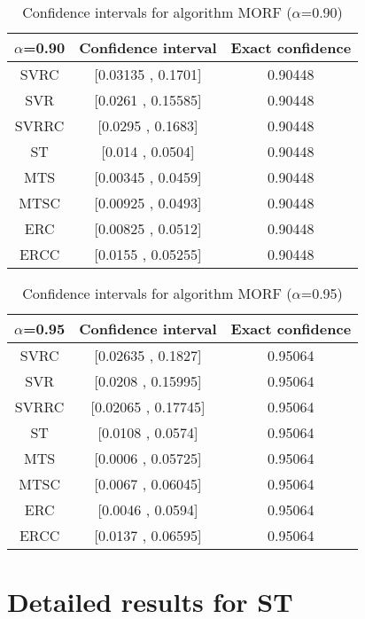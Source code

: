 \documentclass[a4paper,10pt]{article}
\begin{document}
\begin{table}[!htp]
\centering\small
\begin{tabular}{
|c|c|c|}
\hline
 $\alpha$=0.90 & Confidence interval & Exact confidence \\ \hline 
SVRC & [0.03135 , 0.1701] & 0.90448\\ \hline 
SVR & [0.0261 , 0.15585] & 0.90448\\ \hline 
SVRRC & [0.0295 , 0.1683] & 0.90448\\ \hline 
ST & [0.014 , 0.0504] & 0.90448\\ \hline 
MTS & [0.00345 , 0.0459] & 0.90448\\ \hline 
MTSC & [0.00925 , 0.0493] & 0.90448\\ \hline 
ERC & [0.00825 , 0.0512] & 0.90448\\ \hline 
ERCC & [0.0155 , 0.05255] & 0.90448\\ \hline 

\end{tabular}
\caption{Confidence intervals for algorithm MORF ($\alpha$=0.90)}
\end{table}
\begin{table}[!htp]
\centering\small
\begin{tabular}{
|c|c|c|}
\hline
 $\alpha$=0.95 & Confidence interval & Exact confidence \\ \hline 
SVRC & [0.02635 , 0.1827] & 0.95064\\ \hline 
SVR & [0.0208 , 0.15995] & 0.95064\\ \hline 
SVRRC & [0.02065 , 0.17745] & 0.95064\\ \hline 
ST & [0.0108 , 0.0574] & 0.95064\\ \hline 
MTS & [0.0006 , 0.05725] & 0.95064\\ \hline 
MTSC & [0.0067 , 0.06045] & 0.95064\\ \hline 
ERC & [0.0046 , 0.0594] & 0.95064\\ \hline 
ERCC & [0.0137 , 0.06595] & 0.95064\\ \hline 

\end{tabular}
\caption{Confidence intervals for algorithm MORF ($\alpha$=0.95)}
\end{table}

 \clearpage 


\section{Detailed results for ST}
\end{document}
